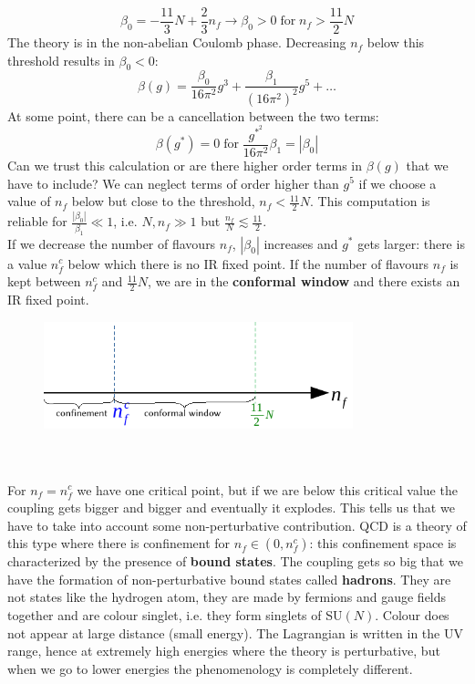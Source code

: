 \documentclass[../main.tex]{subfiles}
\begin{document}
\[
\beta_0=-\frac{11}{3}N+\frac{2}{3}n_f\to\beta_0>0 \;\text{for}\;n_f>\frac{11}{2}N
\]
The theory is in the non-abelian Coulomb phase. Decreasing $n_f$ below this threshold results in $\beta_0<0$:
\[
\beta(g)=\frac{\beta_0}{16\pi^2}g^3+\frac{\beta_1}{(16\pi^2)^2}g^5+\dots
\]
At some point, there can be a cancellation between the two terms:
\[
\beta(g^*)=0 \;\text{for}\;\frac{g^*^2}{16\pi^2}\beta_1=|\beta_0|
\]
Can we trust this calculation or are there higher order terms in $\beta(g)$ that we have to include? We can neglect terms of order higher than $g^5$ if we choose a value of $n_f$ below but close to the threshold, $n_f<\frac{11}{2}N$. This computation is reliable for $\frac{|\beta_0|}{\beta_1}\ll1$, i.e. $N,n_f\gg1$ but $\frac{n_f}{N}\lesssim\frac{11}{2}$.\\
If we decrease the number of flavours $n_f$, $|\beta_0|$ increases and $g^*$ gets larger: there is a value $n_f^c$ below which there is no IR fixed point. If the number of flavours $n_f$ is kept between $n_f^c$ and $\frac{11}{2} N$, we are in the \textbf{conformal window} and there exists an IR fixed point.
\begin{figure}[h]
    \centering
    \includegraphics[width=0.8\textwidth]{Images/conf.pdf}
    \caption{}
\end{figure}\\\\
For $n_f=n_f^c$ we have one critical point, but if we are below this critical value the coupling gets bigger and bigger and eventually it explodes. This tells us that we have to take into account some non-perturbative contribution. QCD is a theory of this type where there is confinement for $n_f\in(0,n_f^c)$: this confinement space is characterized by the presence of \textbf{bound states}. The coupling gets so big that we have the formation of non-perturbative bound states called \textbf{hadrons}. They are not states like the hydrogen atom, they are made by fermions and gauge fields together and are colour singlet, i.e. they form singlets of SU$(N)$. Colour does not appear at large distance (small energy). The Lagrangian is written in the UV range, hence at extremely high energies where the theory is perturbative, but when we go to lower energies the phenomenology is completely different.\\
\end{document}

